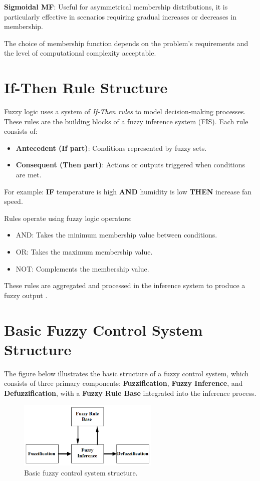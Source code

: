 \documentclass[a4paper,12pt]{report}
\begin{document}
\noindent \textbf{Sigmoidal MF}: Useful for asymmetrical membership distributions, it is particularly effective in scenarios requiring gradual increases or decreases in membership.


The choice of membership function depends on the problem's requirements and the level of computational complexity acceptable.

\section{If-Then Rule Structure}

Fuzzy logic uses a system of \textit{If-Then rules} to model decision-making processes. These rules are the building blocks of a fuzzy inference system (FIS). Each rule consists of:  

\begin{itemize}
    \item \textbf{Antecedent (If part)}: Conditions represented by fuzzy sets.
    \item \textbf{Consequent (Then part)}: Actions or outputs triggered when conditions are met.
\end{itemize}

For example:  
\textbf{IF} temperature is high \textbf{AND} humidity is low \textbf{THEN} increase fan speed.

Rules operate using fuzzy logic operators:  
\begin{itemize}
    \item AND: Takes the minimum membership value between conditions.
    \item OR: Takes the maximum membership value.
    \item NOT: Complements the membership value.
\end{itemize}

These rules are aggregated and processed in the inference system to produce a fuzzy output .

\section{Basic Fuzzy Control System Structure}

The figure below illustrates the basic structure of a fuzzy control system, which consists of three primary components: \textbf{Fuzzification}, \textbf{Fuzzy Inference}, and \textbf{Defuzzification}, with a \textbf{Fuzzy Rule Base} integrated into the inference process.

\begin{figure}[h]
    \centering
    \includegraphics[width=0.6\textwidth]{image.png}
    \caption{Basic fuzzy control system structure.}
\end{figure}
\end{document}
